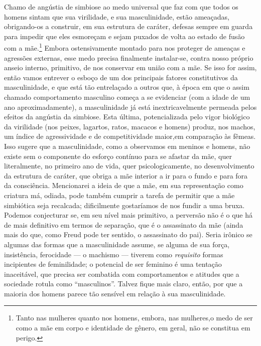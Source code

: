 Chamo de angústia de simbiose ao medo universal que faz com que
todos os homens sintam que sua virilidade, e sua masculinidade, estão
ameaçadas, obrigando-os a construir, em sua estrutura de caráter,
defesas sempre em guarda para impedir que eles esmoreçam e sejam
puxados de volta ao estado de fusão com a mãe.\footnote{ Tanto nas
mulheres quanto nos homens, embora, nas mulheres,\idxangusmul[|nn] o medo de ser como a
mãe em corpo e identidade de gênero, em geral, não se constitua em
perigo.} Embora ostensivamente montado para nos proteger de ameaças
e agressões externas, esse medo precisa finalmente instalar-se, contra
nosso próprio anseio interno, primitivo, de nos conservar em união com
a mãe. Se isso for assim, então vamos entrever o esboço de um dos
principais fatores constitutivos da masculinidade, e que está tão
entrelaçado a outros que, à época em que o assim chamado comportamento
masculino começa a se evidenciar (com a idade de um ano
aproximadamente), a masculinidade já está inextricavelmente permeada
pelos efeitos da angústia da simbiose. Esta última, potencializada pelo
vigor biológico da virilidade (nos peixes, lagartos, ratos, macacos e
homens) produz, nos machos, um índice de agressividade\idxmascag{} e de
competitividade maior,\idxagresmasc[|)] em comparação às fêmeas. Isso sugere que a
masculinidade, como a observamos em meninos e homens, não existe sem o
componente do esforço contínuo para se afastar da mãe, quer
literalmente, no primeiro ano de vida, quer psicologicamente, no
desenvolvimento da estrutura de caráter, que obriga a mãe\idxmaesmald{} interior a ir
para o fundo e para fora da consciência. Mencionarei a ideia de que a
mãe, em sua representação como criatura má, odiada, pode também cumprir
a tarefa de permitir que a mãe simbiótica seja recalcada; dificilmente
gostaríamos de nos fundir a uma bruxa. Podemos conjecturar se, em seu
nível mais primitivo, a perversão não é o que há de mais definitivo em
termos de separação,\idxpervproce{} que é o assassinato da mãe (ainda mais do que,
como Freud pode ter sentido, o assassinato do pai). Seria irônico se
algumas das formas que a masculinidade assume, se alguma de sua força,
insistência, ferocidade --- o machismo --- tiverem como \textit{requisito}     %
formas incipientes de feminilidade;\idxmascufem{} o potencial de ser feminino é uma
tentação inaceitável, que precisa ser combatida com comportamentos e
atitudes que a sociedade rotula como
``masculinos''. Talvez fique mais claro,
então, por que a maioria dos homens parece tão sensível em relação à
sua masculinidade.

